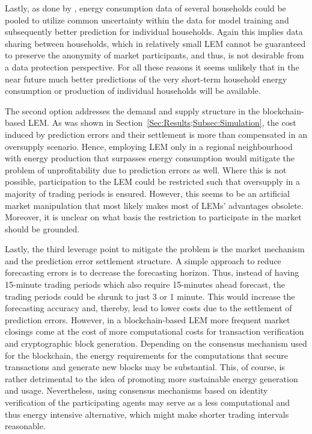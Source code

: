 Lastly, as done by \citet{Shi:2017}, energy consumption data of several households could be pooled to utilize common uncertainty within the data for model training and subsequently better prediction for individual households. Again this implies data sharing between households, which in relatively small LEM cannot be guaranteed to preserve the anonymity of market participants, and thus, is not desirable from a data protection perspective. For all these reasons it seems unlikely that in the near future much better predictions of the very short-term household energy consumption or production of individual households will be available.

The second option addresses the demand and supply structure in the blockchain-based LEM. As was shown in Section~\ref{Sec:Results;Subsec:Simulation}, the cost induced by prediction errors and their settlement is more than compensated in an oversupply scenario. Hence, employing LEM only in a regional neighbourhood with energy production that surpasses energy consumption would mitigate the problem of unprofitability due to prediction errors as well. Where this is not possible, participation to the LEM could be restricted such that oversupply in a majority of trading periods is ensured. However, this seems to be an artificial market manipulation that most likely makes most of LEMs' advantages obsolete. Moreover, it is unclear on what basis the restriction to participate in the market should be grounded.

Lastly, the third leverage point to mitigate the problem is the market mechanism and the prediction error settlement structure. A simple approach to reduce forecasting errors is to decrease the forecasting horizon. Thus, instead of having 15-minute trading periods which also require 15-minutes ahead forecast, the trading periods could be shrunk to just 3 or 1 minute. This would increase the forecasting accuracy and, thereby, lead to lower costs due to the settlement of prediction errors. However, in a blockchain-based LEM more frequent market closings come at the cost of more computational costs for transaction verification and cryptographic block generation. Depending on the consensus mechanism used for the blockchain, the energy requirements for the computations that secure transactions and generate new blocks may be substantial. This, of course, is rather detrimental to the idea of promoting more sustainable energy generation and usage. Nevertheless, using consensus mechanisms based on identity verification of the participating agents may serve as a less computational and thus energy intensive alternative, which might make shorter trading intervals reasonable.

